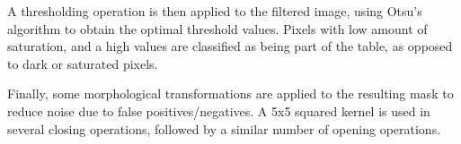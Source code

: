 A thresholding operation is then applied to the filtered image, using Otsu's algorithm  to obtain the optimal threshold values. Pixels with low amount of saturation, and a high values are classified as being part of the table, as opposed to dark or saturated pixels.

Finally, some morphological transformations are applied to the resulting mask to reduce noise due to false positives/negatives. A 5x5 squared kernel is used in several closing operations, followed by a similar number of opening operations.

